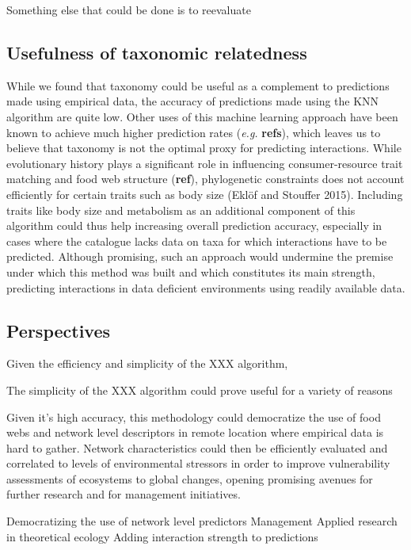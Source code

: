 \documentclass[letterpaper]{article}
\begin{document}
Something else that could be done is to reevaluate




\subsection{Usefulness of taxonomic relatedness}
 While we found that taxonomy could be useful as a complement to predictions made using empirical data, the accuracy of predictions made using the KNN algorithm are quite low. Other uses of this machine learning approach have been known to achieve much higher prediction rates (\textit{e.g.} \textbf{refs}), which leaves us to believe that taxonomy is not the optimal proxy for predicting interactions. While evolutionary history plays a significant role in influencing consumer-resource trait matching and food web structure (\textbf{ref}), phylogenetic constraints does not account efficiently for certain traits such as body size (Eklöf and Stouffer 2015). Including traits like body size and metabolism as an additional component of this algorithm could thus help increasing overall prediction accuracy, especially in cases where the catalogue lacks data on taxa for which interactions have to be predicted. Although promising, such an approach would undermine the premise under which this method was built and which constitutes its main strength, predicting interactions in data deficient environments using readily available data.





\subsection{Perspectives}
Given the efficiency and simplicity of the XXX algorithm,

The simplicity of the XXX algorithm could prove useful for a variety of reasons



Given it’s high accuracy, this methodology could democratize the use of food webs and network level descriptors in remote location where empirical data is hard to gather. Network characteristics could then be efficiently evaluated and correlated to levels of environmental stressors in order to improve vulnerability assessments of ecosystems to global changes, opening promising avenues for further research and for management initiatives.



Democratizing the use of network level predictors
Management
Applied research in theoretical ecology
Adding interaction strength to predictions
\end{document}
